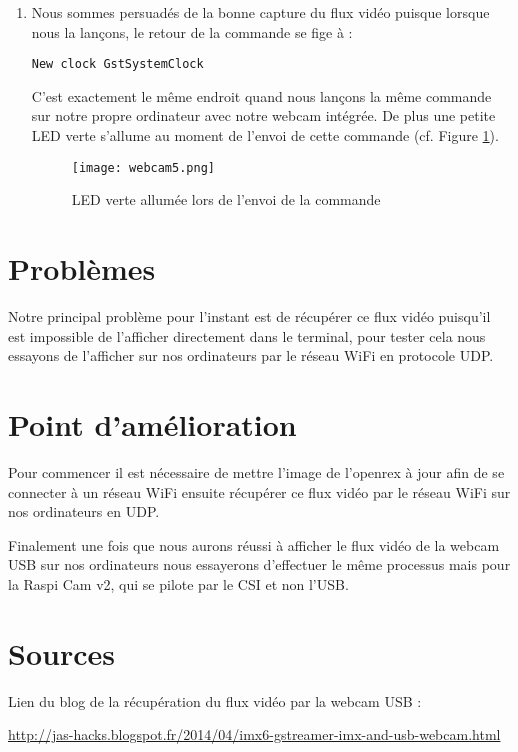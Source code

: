 \begin{enumerate}
\item Nous sommes persuadés de la bonne capture du flux vidéo puisque lorsque
nous la lançons, le retour de la commande se fige à :

\begin{lstlisting}
New clock GstSystemClock
\end{lstlisting}

C'est exactement le même endroit quand nous lançons la même commande sur notre
propre ordinateur avec notre webcam intégrée. De plus une petite LED verte s’allume
au moment de l’envoi de cette commande (cf. Figure \ref{fig:webcam5}).
\begin{figure}[th]
    \centering
    \texttt{[image: webcam5.png]}
    \decoRule
    \caption{LED verte allumée lors de l'envoi de la commande}  \label{fig:webcam5}
\end{figure}

\end{enumerate}

\section{Problèmes}

Notre principal problème pour l’instant est de récupérer ce flux vidéo puisqu’il
est impossible de l’afficher directement dans le terminal, pour tester cela nous
essayons de l’afficher sur nos ordinateurs par le réseau WiFi en protocole UDP.

\section{Point d'amélioration}

Pour commencer il est nécessaire de mettre l’image de l'openrex à jour afin de se
connecter à un réseau WiFi ensuite récupérer ce flux vidéo par le réseau WiFi sur
nos ordinateurs en UDP.

Finalement une fois que nous aurons réussi à afficher le flux vidéo de la webcam
USB sur nos ordinateurs nous essayerons d’effectuer le même processus mais pour
la Raspi Cam v2, qui se pilote par le CSI et non l’USB.

\section{Sources}

Lien du blog de la récupération du flux vidéo par la webcam USB : 

\href{http://jas-hacks.blogspot.fr/2014/04/imx6-gstreamer-imx-and-usb-webcam.html}
{http://jas-hacks.blogspot.fr/2014/04/imx6-gstreamer-imx-and-usb-webcam.html}
